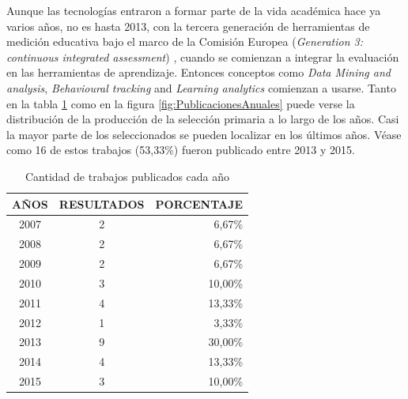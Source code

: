 Aunque las tecnologías entraron a formar parte de la vida académica hace ya varios años, no es hasta 2013, con la tercera generación de herramientas de medición educativa bajo el marco de la Comisión Europea (\emph{Generation 3: continuous integrated assessment}) \cite{Redecker:2013}, cuando se comienzan a integrar la evaluación en las herramientas de aprendizaje. Entonces conceptos como \emph{Data Mining and analysis}, \emph{Behavioural tracking} and \emph{Learning analytics} comienzan a usarse. Tanto en la tabla \ref{tab:ResumenAniosResultados} como en la figura \ref{fig:PublicacionesAnuales} puede verse la distribución de la producción de la selección primaria a lo largo de los años. Casi la mayor parte de los seleccionados se pueden localizar en los últimos años. Véase como 16 de estos trabajos (53,33\%) fueron publicado entre 2013 y 2015.


\begin{table}
  \begin{center}
  \begin{tabular}{| c | c | r |}
    \hline
    AÑOS & RESULTADOS & PORCENTAJE\\
    \hline    
    \hline
    2007 & 2 & 6,67\%\\
    \hline
    2008 & 2 & 6,67\%\\
    \hline
    2009 & 2 & 6,67\%\\
    \hline
    2010 & 3 & 10,00\%\\
    \hline
    2011 & 4 & 13,33\%\\
    \hline
    2012 & 1 & 3,33\%\\
    \hline
    2013 & 9 & 30,00\% \\
    \hline
    2014 & 4 & 13,33\%\\
    \hline
    2015 & 3 & 10,00\% \\
    \hline
  \end{tabular}
\end{center}
\caption{Cantidad de trabajos publicados cada año}
\label{tab:ResumenAniosResultados}
\end{table}

